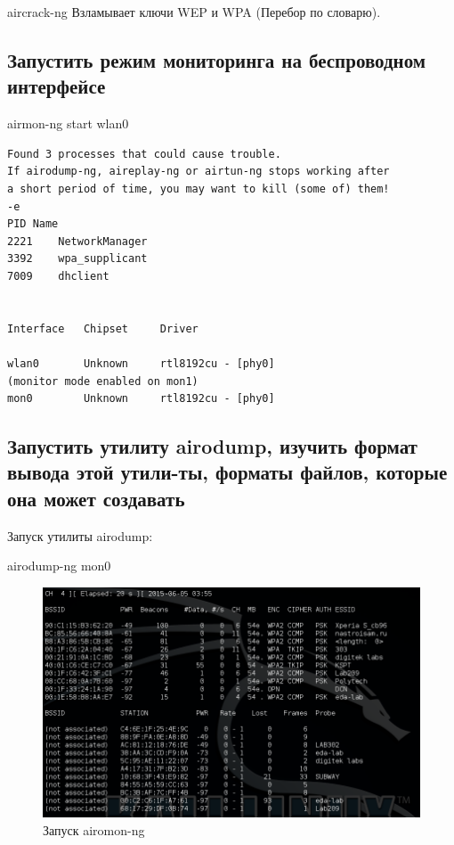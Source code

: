 \documentclass[11pt, a4paper]{article}		%
\begin{document}
aircrack-ng	Взламывает ключи WEP и WPA (Перебор по словарю).




\subsection{Запустить режим мониторинга на беспроводном интерфейсе}

airmon-ng start wlan0

\begin{verbatim}
Found 3 processes that could cause trouble.
If airodump-ng, aireplay-ng or airtun-ng stops working after
a short period of time, you may want to kill (some of) them!
-e 
PID	Name
2221	NetworkManager
3392	wpa_supplicant
7009	dhclient


Interface	Chipset		Driver

wlan0		Unknown 	rtl8192cu - [phy0]
(monitor mode enabled on mon1)
mon0		Unknown 	rtl8192cu - [phy0]
\end{verbatim}


\subsection{Запустить утилиту airodump, изучить формат вывода этой утили-ты, форматы файлов, которые она может создавать}

Запуск утилиты airodump:

airodump-ng mon0

\begin{figure}[h!]
	\centering
	\includegraphics[scale=0.80]{res/airomon}
	\caption{Запуск airomon-ng}
\end{figure}
\end{document}
